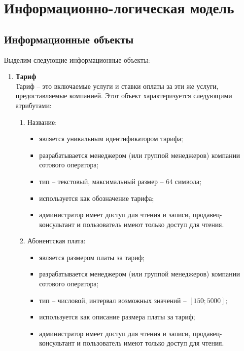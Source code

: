 \section{Информационно-логическая модель}\label{sec:infological-model}

\subsection{Информационные объекты}\label{subsec:information-objects}

Выделим следующие информационные объекты:
\begin{enumerate}
    \item \textbf{Тариф} \\
    Тариф -- это включаемые услуги и ставки оплаты за эти же услуги, предоставляемые компанией. Этот объект характеризуется следующими атрибутами:
    \begin{enumerate}
        \item Название:
        \begin{itemize}
            \item является уникальным идентификатором тарифа;
            \item разрабатывается менеджером (или группой менеджеров) компании сотового оператора;
            \item тип -- текстовый, максимальный размер -- 64 символа;
            \item используется как обозначение тарифа;
            \item администратор имеет доступ для чтения и записи, продавец-консультант и пользователь имеют только доступ для чтения.
        \end{itemize}

        \item Абонентская плата:
        \begin{itemize}
            \item является размером платы за тариф;
            \item разрабатывается менеджером (или группой менеджеров) компании сотового оператора;
            \item тип -- числовой, интервал возможных значений -- $[150; 5000]$;
            \item используется как описание размера платы за тариф;
            \item администратор имеет доступ для чтения и записи, продавец-консультант и пользователь имеют только доступ для чтения.
        \end{itemize}


\end{enumerate}
\end{enumerate}
